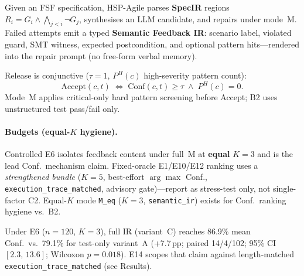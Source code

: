 Given an FSF specification, HSP-Agile parses \textbf{SpecIR} regions
$R_i = G_i \wedge \bigwedge_{j<i}\neg G_j$, synthesises an LLM candidate, and
repairs under mode~M.
Failed attempts emit a typed \textbf{Semantic Feedback IR}: scenario label,
violated guard, SMT witness, expected postcondition, and optional pattern
hits---rendered into the repair prompt (no free-form verbal memory).

Release is conjunctive ($\tau{=}1$, $P^H(c)$ high-severity pattern count):
\begin{equation}
  \mathrm{Accept}(c,t)
  \;\iff\;
  \mathrm{Conf}(c,t)\geq\tau
  \;\wedge\;
  P^H(c)=0.
  \label{eq:accept-conf}
\end{equation}
Mode~M applies critical-only hard pattern screening before Accept; B2 uses
unstructured test pass/fail only.

\paragraph{Budgets (equal-$K$ hygiene).}
Controlled E6 isolates feedback content under full~M at \textbf{equal} $K{=}3$
and is the lead Conf.\ mechanism claim.
Fixed-oracle E1/E10/E12 ranking uses a \emph{strengthened bundle} ($K{=}5$,
best-effort $\arg\max$ Conf., \texttt{execution\_trace\_matched}, advisory
gate)---report as stress-test only, not single-factor C2.
Equal-$K$ mode \texttt{M\_eq} ($K{=}3$, \texttt{semantic\_ir}) exists for Conf.\
ranking hygiene vs.\ B2.

Under E6 ($n{=}120$, $K{=}3$), full IR (variant~C) reaches 86.9\% mean Conf.\
vs.\ 79.1\% for test-only variant~A (+7.7\,pp; paired 14/4/102; 95\% CI
$[2.3,\,13.6]$; Wilcoxon $p{=}0.018$).
E14 scopes that claim against length-matched
\texttt{execution\_trace\_matched} (see Results).
